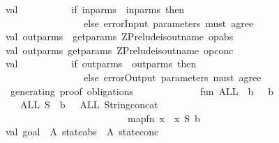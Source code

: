 \begin{isabellebody}
\ \ \ \ \ \ \ \ \ \ \ val\ {\isacharunderscore}\ \ \ \ \ \ \ \ \ {\isacharequal}\ if\ in{\isacharunderscore}parms\ {\isacharequal}\ in{\isacharunderscore}parms{\isacharprime}\ then\ {\isacharparenleft}{\isacharparenright}\isanewline
\ \ \ \ \ \ \ \ \ \ \ \ \ \ \ \ \ \ \ \ \ \ \ \ \ \ \ else\ error{\isacharparenleft}{\isachardoublequote}Input\ parameters\ must\ agree\ {\isacharbang}{\isachardoublequote}{\isacharparenright}\isanewline
\ \ \ \ \ \ \ \ \ \ \ val\ out{\isacharunderscore}parms\ {\isacharequal}\ get{\isacharunderscore}params\ ZPrelude{\isachardot}is{\isacharunderscore}out{\isacharunderscore}name\ op{\isacharunderscore}abs\isanewline
\ \ \ \ \ \ \ \ \ \ \ val\ out{\isacharunderscore}parms{\isacharprime}{\isacharequal}\ get{\isacharunderscore}params\ ZPrelude{\isachardot}is{\isacharunderscore}out{\isacharunderscore}name\ op{\isacharunderscore}conc\isanewline
\ \ \ \ \ \ \ \ \ \ \ val\ {\isacharunderscore}\ \ \ \ \ \ \ \ \ {\isacharequal}\ if\ out{\isacharunderscore}parms\ {\isacharequal}\ out{\isacharunderscore}parms{\isacharprime}\ then\ {\isacharparenleft}{\isacharparenright}\isanewline
\ \ \ \ \ \ \ \ \ \ \ \ \ \ \ \ \ \ \ \ \ \ \ \ \ \ \ else\ error{\isacharparenleft}{\isachardoublequote}Output\ parameters\ must\ agree\ {\isacharbang}{\isachardoublequote}{\isacharparenright}\isanewline
\ \isanewline
\ \ \ \ \ \ \ \ \ \ \ {\isacharparenleft}{\isacharasterisk}\ generating\ proof\ obligations\ {\isachardot}{\isachardot}{\isachardot}\ {\isacharasterisk}{\isacharparenright}\isanewline
\ \ \ \ \ \ \ \ \ \ \ fun\ ALL\ {\isacharbrackleft}{\isacharbrackright}\ b\ \ {\isacharequal}\ {\isachardoublequote}{\isacharparenleft}{\isachardoublequote}{\isacharcircum}b{\isacharcircum}{\isachardoublequote}{\isacharparenright}{\isachardoublequote}\isanewline
\ \ \ \ \ \ \ \ \ \ \ \ \ \ {\isacharbar}ALL\ S\ \ b\ \ {\isacharequal}\ {\isachardoublequote}{\isacharparenleft}ALL\ {\isachardoublequote}{\isacharcircum}{\isacharparenleft}String{\isachardot}concat\ \isanewline
\ \ \ \ \ \ \ \ \ \ \ \ \ \ \ \ \ \ \ \ \ \ \ \ \ \ \ \ \ \ \ \ \ \ \ \ {\isacharparenleft}map{\isacharparenleft}fn\ x\ {\isacharequal}{\isachargreater}\ x{\isacharcircum}{\isachardoublequote}\ {\isachardoublequote}{\isacharparenright}S{\isacharparenright}{\isacharparenright}{\isacharcircum}{\isachardoublequote}{\isachardot}\ {\isachardoublequote}{\isacharcircum}b{\isacharcircum}{\isachardoublequote}{\isacharparenright}{\isachardoublequote}\isanewline
\isanewline
\ \ \ \ \ \ \ \ \ \ \ val\ goal{}\ {\isacharequal}\ {\isachardoublequote}{\isacharpercent}A\ {\isachardoublequote}{\isacharcircum}state{\isacharunderscore}abs{\isacharcircum}{\isachardoublequote}\ {\isacharat}\ {\isacharparenleft}{\isacharpercent}A\ {\isachardoublequote}{\isacharcircum}state{\isacharunderscore}conc{\isacharcircum}{\isachardoublequote}\ {\isacharat}\ {\isachardoublequote}{\isacharcircum}\isanewline

\end{isabellebody}
